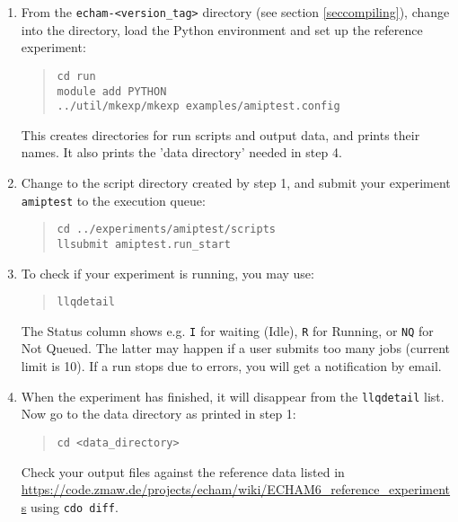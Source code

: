 \begin{enumerate}

\item 

From the \verb|echam-<version_tag>| directory (see section \ref{seccompiling}),
change into the  directory, load the Python environment and set up
the reference experiment:
%
\begin{quote}
\begin{verbatim}
cd run
module add PYTHON
../util/mkexp/mkexp examples/amiptest.config
\end{verbatim}
\end{quote}

This creates directories for run scripts and output data, and prints their
names. It also prints the 'data directory' needed in step 4.

\item

Change to the script directory created by step 1, and submit your experiment
\texttt{amiptest} to the execution queue:
%
\begin{quote}
\begin{verbatim}
cd ../experiments/amiptest/scripts
llsubmit amiptest.run_start
\end{verbatim}
\end{quote}

\item

To check if your experiment is running, you may use:
%
\begin{quote}
\begin{verbatim}
llqdetail
\end{verbatim}
\end{quote}

The Status column shows e.g. \verb|I| for waiting (Idle), \verb|R| for Running,
or \verb|NQ| for Not Queued. The latter may happen if a user submits too many
jobs (current limit is 10). If a run stops due to errors, you will get a
notification by email.

\item 

When the experiment has finished, it will disappear from the \verb|llqdetail|
list. Now go to the data directory as printed in step 1:
%
\begin{quote}
\begin{verbatim}
cd <data_directory>
\end{verbatim}
\end{quote}

Check your output files against the reference data listed in
\url{https://code.zmaw.de/projects/echam/wiki/ECHAM6_reference_experiments}
using \verb|cdo diff|.

\end{enumerate}

